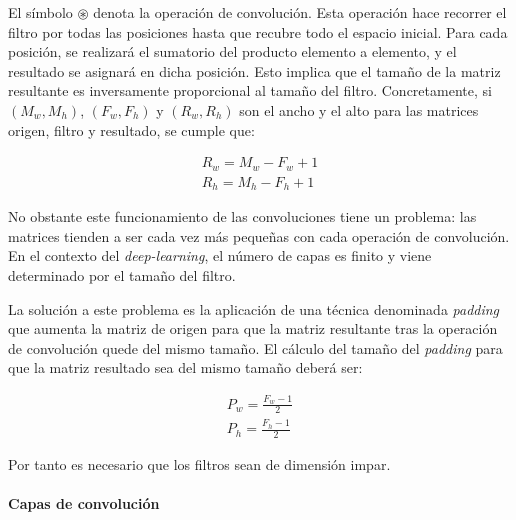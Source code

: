 El símbolo $\circledast$ denota la operación de convolución. Esta operación hace recorrer el filtro por todas las posiciones hasta que recubre todo el espacio inicial. Para cada posición, se realizará el sumatorio del producto elemento a elemento, y el resultado se asignará en dicha posición. Esto implica que el tamaño de la matriz resultante es inversamente proporcional al tamaño del filtro. Concretamente, si $(M_w, M_h)$, $(F_w, F_h)$ y $(R_w, R_h)$ son el ancho y el alto para las matrices origen, filtro y resultado, se cumple que:

\begin{align}
	R_w = M_w - F_w + 1 \\
	R_h = M_h - F_h + 1
	\label{eq:convolve-result-sizes-basic}
\end{align}

No obstante este funcionamiento de las convoluciones tiene un problema: las matrices tienden a ser cada vez más pequeñas con cada operación de convolución. En el contexto del \textit{deep-learning}, el número de capas es finito y viene determinado por el tamaño del filtro.

La solución a este problema es la aplicación de una técnica denominada \textit{padding} que aumenta la matriz de origen para que la matriz resultante tras la operación de convolución quede del mismo tamaño. El cálculo del tamaño del \textit{padding} para que la matriz resultado sea del mismo tamaño deberá ser:

\begin{align}
	P_w = \frac{F_w - 1}{2} \\
	P_h = \frac{F_h - 1}{2} 
	\label{eq:convolve-filter-padding-dims}
\end{align}

Por tanto es necesario que los filtros sean de dimensión impar.

\paragraph{Capas de convolución}

